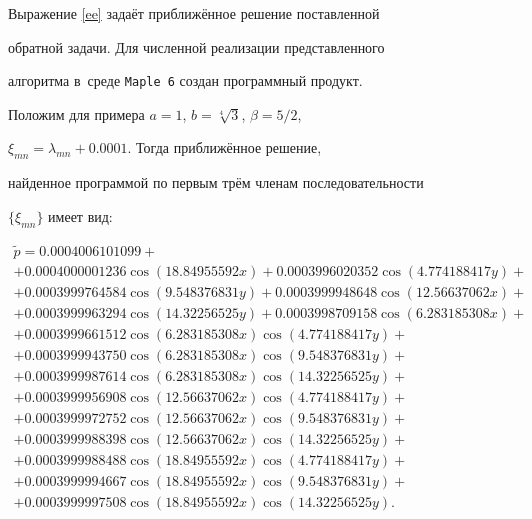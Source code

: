Выражение \eqref{ee} задаёт приближённое решение поставленной

обратной задачи. Для численной реализации представленного

алгоритма в~среде {\tt Maple~6} создан программный продукт.



Положим для примера $a=1$, $ b=\sqrt[4]{3}$, $\beta=5/2$, 

$\xi_{mn}=\lambda_{mn}+0.0001 $.  Тогда приближённое решение, 

найденное программой по первым трём членам последовательности

$\{\xi_{mn}\}$ имеет вид:

\begin{multline*}

 \widetilde{p}=0.0004006101099+\\

+0.0004000001236\cos(18.84955592x)+0.0003996020352\cos(4.774188417y)+

\\

+0.0003999764584\cos(9.548376831y)+0.0003999948648\cos(12.56637062x)+

\\

+0.0003999963294\cos(14.32256525y)+0.0003998709158\cos(6.283185308x)+

\\

+0.0003999661512\cos(6.283185308x)\cos(4.774188417y)+

\\

+0.0003999943750\cos(6.283185308x)\cos(9.548376831y)+

\\

+0.0003999987614\cos(6.283185308x)\cos(14.32256525y)+

\\

+0.0003999956908\cos(12.56637062x)\cos(4.774188417y)+

\\

+0.0003999972752\cos(12.56637062x)\cos(9.548376831y)+

\\

+0.0003999988398\cos(12.56637062x)\cos(14.32256525y)+

\\

+0.0003999988488\cos(18.84955592x)\cos(4.774188417y)+

\\

+0.0003999994667\cos(18.84955592x)\cos(9.548376831y)+

\\

+0.0003999997508\cos(18.84955592x)\cos(14.32256525y) .

\end{multline*}



